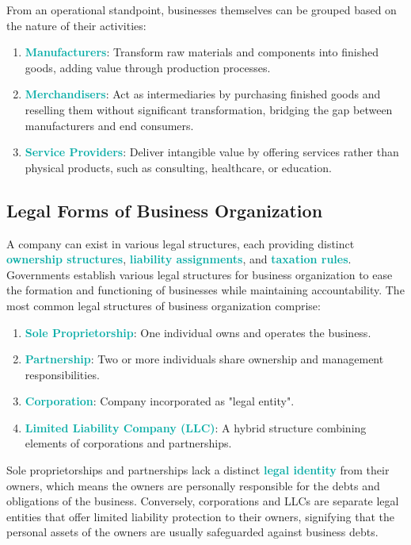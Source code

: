 \documentclass[twoside]{article}
\newcommand{\highlightbluetext}[1]{\textcolor[HTML]{09ACA6}{\textbf{#1}}}
\numberwithin{equation}{section}
\begin{document}
    \newpage

    From an operational standpoint, businesses themselves can be grouped based on the nature of their activities:
    \begin{enumerate}
        \item \highlightbluetext{Manufacturers}: Transform raw materials and components into finished goods, adding value through production processes.
        \item \highlightbluetext{Merchandisers}: Act as intermediaries by purchasing finished goods and reselling them without significant transformation, bridging the gap between manufacturers and end consumers.
        \item \highlightbluetext{Service Providers}: Deliver intangible value by offering services rather than physical products, such as consulting, healthcare, or education.
    \end{enumerate}

	\subsection{Legal Forms of Business Organization}
	\label{subsec:LegalFormsOfBusinessOrganization}
	A company can exist in various legal structures, each providing distinct \highlightbluetext{ownership structures}, \highlightbluetext{liability assignments}, and \highlightbluetext{taxation rules}. Governments establish various legal structures for business organization to ease the formation and functioning of businesses while maintaining accountability. The most common legal structures of business organization comprise:
	\begin{enumerate}
		\item \highlightbluetext{Sole Proprietorship}: One individual owns and operates the business.
		\item \highlightbluetext{Partnership}: Two or more individuals share ownership and management responsibilities.
		\item \highlightbluetext{Corporation}: Company incorporated as "legal entity".
		\item \highlightbluetext{Limited Liability Company (LLC)}: A hybrid structure combining elements of corporations and partnerships.
	\end{enumerate}
	Sole proprietorships and partnerships lack a distinct \highlightbluetext{legal identity} from their owners, which means the owners are personally responsible for the debts and obligations of the business. Conversely, corporations and LLCs are separate legal entities that offer limited liability protection to their owners, signifying that the personal assets of the owners are usually safeguarded against business debts.
\end{document}
